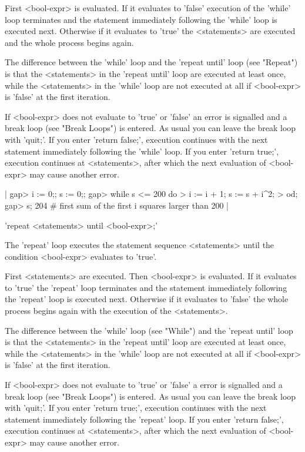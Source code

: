 First <bool-expr> is evaluated.  If it evaluates  to 'false' execution of
the 'while' loop  terminates and the  statement immediately following the
'while' loop is executed next.  Otherwise if  it evaluates  to 'true' the
<statements> are executed and the whole process begins again.

The  difference  between the 'while'   loop and the  'repeat  until' loop
(see "Repeat") is that the <statements>  in  the  'repeat until' loop are
executed at least  once, while the  <statements> in the  'while' loop are
not executed at all if <bool-expr> is 'false' at the first iteration.

If  <bool-expr>  does  not  evaluate to 'true'  or 'false'  an  error  is
signalled  and a break loop (see "Break Loops") is entered.  As usual you
can  leave the break loop with 'quit;'.   If you  enter  'return false;',
execution  continues with the  next  statement immediately following  the
'while'  loop.   If you  enter  'return  true;',  execution continues  at
<statements>, after  which  the  next evaluation of <bool-expr> may cause
another error.

|    gap> i := 0;;  s := 0;;
    gap> while s <= 200  do
    >        i := i + 1;  s := s + i^2;
    >    od;
    gap> s;
    204        # first sum of the first i squares larger than 200 |

%

'repeat <statements>  until <bool-expr>;'

The 'repeat' loop executes  the statement sequence <statements> until the
condition <bool-expr> evaluates to 'true'.

First <statements> are executed.   Then <bool-expr> is  evaluated.  If it
evaluates   to 'true' the  'repeat'   loop  terminates and  the statement
immediately following the  'repeat' loop is  executed next.  Otherwise if
it evaluates to 'false' the whole process begins again with the execution
of the <statements>.

The  difference  between the 'while'  loop (see "While")  and the 'repeat
until' loop  is that the  <statements>  in  the  'repeat until' loop  are
executed  at least once,  while the  <statements> in the 'while' loop are
not executed at all if <bool-expr> is 'false' at the first iteration.

If  <bool-expr>  does  not evaluate to  'true'   or  'false' a  error  is
signalled and a break loop (see "Break Loops") is entered.  As  usual you
can leave  the break loop  with 'quit;'.   If  you  enter 'return true;',
execution continues with the  next statement   immediately following  the
'repeat' loop.   If you  enter 'return   false;', execution continues  at
<statements>, after which the next  evaluation  of  <bool-expr> may cause
another error.

